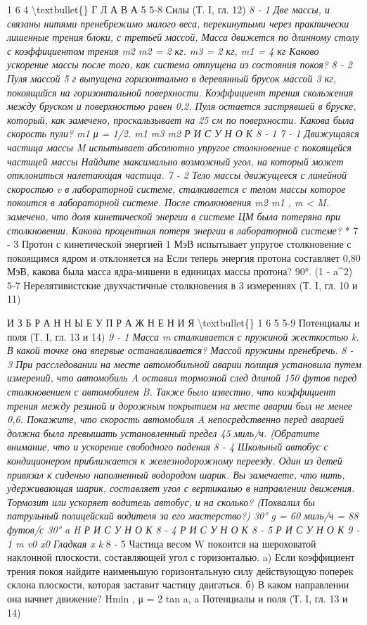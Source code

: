 \documentclass[10pt,oneside]{article}
\begin{document}
1 6 4 \textbackslash{}textbullet\{\} Г Л А В А  5 5-8 Силы (Т. I, гл. 12) \emph{ 8 - 1 Две массы, и связаны нитями пренебрежимо малого веса, перекинутыми через практически лишенные трения блоки, с третьей массой, Масса движется по длинному столу с коэффициентом трения m2 m2 = 2 кг. m3 = 2 кг, m1 = 4 кг Каково ускорение массы после того, как система отпущена из состояния покоя? } \emph{ 8 - 2 Пуля массой 5 г выпущена горизонтально в деревянный брусок массой 3 кг, покоящийся на горизонтальной поверхности. Коэффициент трения скольжения между бруском и поверхностью равен 0,2. Пуля остается застрявшей в бруске, который, как замечено, проскальзывает на 25 см по поверхности. Какова была скорость пули? m1 μ = 1/2. m1 m3 m2 Р И С У Н О К  8 - 1 } \emph{ 7 - 1 Движущаяся частица массы M испытывает абсолютно упругое столкновение с покоящейся частицей массы Найдите максимально возможный угол, на который может отклониться налетающая частица. } \emph{ 7 - 2 Тело массы движущееся с линейной скоростью v в лабораторной системе, сталкивается с телом массы которое покоится в лабораторной системе. После столкновения m2 m1 , m < M. замечено, что доля кинетической энергии в системе ЦМ была потеряна при столкновении. Какова процентная потеря энергии в лабораторной системе? } * 7 - 3 Протон с кинетической энергией 1 МэВ испытывает упругое столкновение с покоящимся ядром и отклоняется на Если теперь энергия протона составляет 0,80 МэВ, какова была масса ядра-мишени в единицах массы протона? 90°. (1 - a\textasciicircum{}2) 5-7 Нерелятивистские двухчастичные столкновения в 3 измерениях (Т. I, гл. 10 и 11)\par

И З Б Р А Н Н Ы Е  У П Р А Ж Н Е Н И Я \textbackslash{}textbullet\{\} 1 6 5 5-9 Потенциалы и поля (Т. I, гл. 13 и 14) \emph{ 9 - 1 Масса m сталкивается с пружиной жесткостью k. В какой точке она впервые останавливается? Массой пружины пренебречь. } \emph{ 8 - 3 При расследовании на месте автомобильной аварии полиция установила путем измерений, что автомобиль A оставил тормозной след длиной 150 футов перед столкновением с автомобилем B. Также было известно, что коэффициент трения между резиной и дорожным покрытием на месте аварии был не менее 0,6. Покажите, что скорость автомобиля A непосредственно перед аварией должна была превышать установленный предел 45 миль/ч. (Обратите внимание, что и ускорение свободного падения } \emph{ 8 - 4 Школьный автобус с кондиционером приближается к железнодорожному переезду. Один из детей привязал к сиденью наполненный водородом шарик. Вы замечаете, что нить, удерживающая шарик, составляет угол с вертикалью в направлении движения. Тормозит или ускоряет водитель автобус, и на сколько? (Похвалил бы патрульный полицейский водителя за его мастерство?) 30° g = 60 миль/ч = 88 футов/с 30° a H Р И С У Н О К  8 - 4 Р И С У Н О К  8 - 5 Р И С У Н О К  9 - 1 m v0 x0 Гладкая x k } \emph{ } 8 - 5 Частица весом W покоится на шероховатой наклонной плоскости, составляющей угол с горизонталью. a) Если коэффициент трения покоя найдите наименьшую горизонтальную силу действующую поперек склона плоскости, которая заставит частицу двигаться. б) В каком направлении она начнет движение? Hmin , μ = 2 tan a, a Потенциалы и поля (Т. I, гл. 13 и 14)\par
\end{document}
